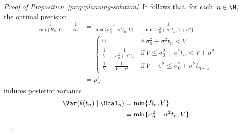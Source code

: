 \begin{proof}[Proof of Proposition~\ref{prop:planning-solution}]
    It follows that, for each~$n\in\N$, the optimal precision
    \begin{align*}
        \frac{1}{\min\{R_n,V\}}-\frac{1}{R_n}
        &= \frac{1}{\min\{\sigma_0^2+\sigma^2t_n,V\}}-\frac{1}{\min\{\sigma_0^2+\sigma^2t_n,V+\sigma^2\}} \\
        &= \begin{cases}
            0 & \text{if}\ \sigma_0^2+\sigma^2t_n<V \\
            \frac{1}{V}-\frac{1}{\sigma_0^2+\sigma^2t_n} & \text{if}\ V\le\sigma_0^2+\sigma^2t_n<V+\sigma^2 \\
            \frac{1}{V}-\frac{1}{V+\sigma^2} & \text{if}\ V+\sigma^2\le\sigma_0^2+\sigma^2t_{n-1}
        \end{cases} \\
        &= p_n^\dag
    \end{align*}
    induces posterior variance
    \begin{align*}
        \Var(\theta(t_n)\mid\Hcal_n)
        &= \min\{R_n,V\} \\
        &= \min\{\sigma_0^2+\sigma^2t_n,V\}.\qedhere
    \end{align*}
\end{proof}
